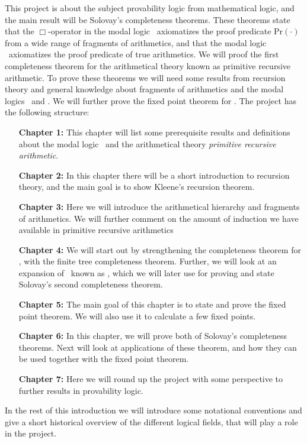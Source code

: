 \documentclass[../main.tex]{subfiles}
\begin{document}
This project is about the subject provability logic from mathematical logic,
and the main result will be Solovay's completeness theorems. These theorems
state that the $\Box$-operator in the  modal logic \GL\  axiomatizes the proof
predicate $\text{Pr}(\cdot)$ from a wide range of fragments of arithmetics, and
that the modal logic \GLS\ axiomatizes the proof predicate of true arithmetics.
We will proof the first completeness theorem for the arithmetical theory known
as primitive recursive arithmetic.
To prove these theorems we will need some results from recursion theory and
general knowledge about fragments of arithmetics and the modal logics \GL\ and
\GLS. We will further prove the fixed point theorem for \GL.
The project has the following structure: 
\begin{enumerate}
	\item[\textbf{Chapter 1:}] This chapter will list some prerequisite results and
		definitions about the modal logic \GL\ and the arithmetical
		theory  \textit{primitive
		recursive arithmetic}. 
	\item[\textbf{Chapter 2:}] In this chapter there will be a short introduction to recursion
		theory, and the main goal is to show Kleene's recursion theorem.
	\item[\textbf{Chapter 3:}] Here we will introduce the arithmetical hierarchy and
		fragments of arithmetics. We will further comment on the amount
		of induction we have available in primitive recursive
		arithmetics
	\item[\textbf{Chapter 4:}] We will start out by strengthening the completeness
		theorem for \GL, with the finite tree completeness theorem.
		Further, we will look at an expansion of \GL\ known as \GLS,
		which we will later use  for proving and state Solovay's second completeness
		theorem.
	\item[\textbf{Chapter 5:}] The main goal of this chapter is to state and prove
		the fixed point theorem. We will also use it to calculate a few fixed
		points.
	\item[\textbf{Chapter 6:}] In this chapter, we will prove both of Solovay's
		completeness theorems. Next will look
		at applications of these theorem, and how they can be used
		together with the fixed point theorem.
	\item[\textbf{Chapter 7:}] Here we will round up the project with some
		perspective to further results in provability logic.
\end{enumerate}

In the rest of this introduction we will introduce some notational
conventions and give a short historical overview of the different logical
fields, that will play a role in the project.
\end{document}
